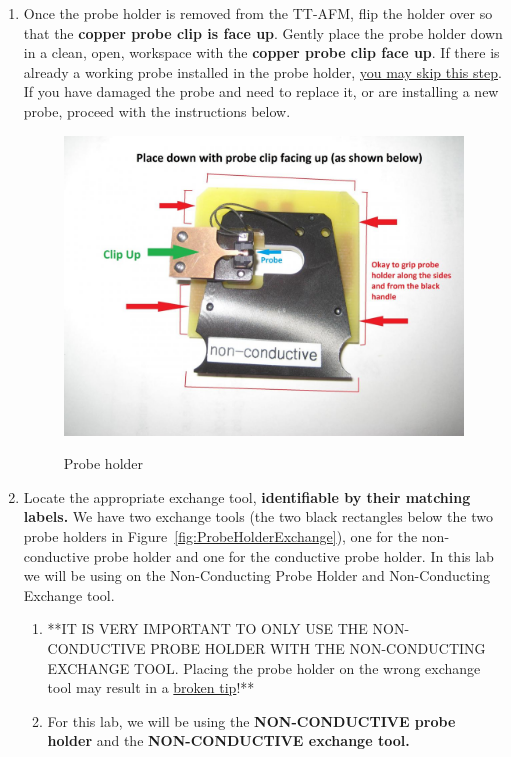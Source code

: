 \documentclass{../lab}
\begin{document}
\begin{enumerate}
    \item Once the probe holder is removed from the TT-AFM, flip the holder over so that the \textbf{copper probe clip is face up}. Gently place the probe holder down in a clean, open, workspace with the \textbf{copper probe clip face up}. If there is already a working probe installed in the probe holder, \hyperref[subsec:HowToPrepareASample]{you may skip this step}.  If you have damaged the probe and need to replace it, or are installing a new probe, proceed with the instructions below.

    \begin{figure}[H]
        \centering
        \href{http://experimentationlab.berkeley.edu/sites/default/files/AFMImages/15.JPG}{\includegraphics[width=0.71\linewidth]{images/15.JPG}}
        \caption{Probe holder}
        \label{fig:YellowSlideDescription}
    \end{figure}
    
    \item Locate the appropriate exchange tool, \textbf{identifiable by their matching labels.} We have two exchange tools (the two black rectangles below the two probe holders in Figure~\ref{fig:ProbeHolderExchange}), one for the non-conductive probe holder and one for the conductive probe holder. In this lab we will be using on the Non-Conducting Probe Holder and Non-Conducting Exchange tool.
    \begin{enumerate}
        \item **IT IS VERY IMPORTANT TO ONLY USE THE NON-CONDUCTIVE PROBE HOLDER WITH THE NON-CONDUCTING EXCHANGE TOOL.  Placing the probe holder on the wrong exchange tool may result in a \hyperref[subsec:BrokenTip]{broken tip}!**

        \item For this lab, we will be using the \textbf{NON-CONDUCTIVE probe holder} and the \textbf{NON-CONDUCTIVE exchange tool.}
    \end{enumerate}


\end{enumerate}
\end{document}
